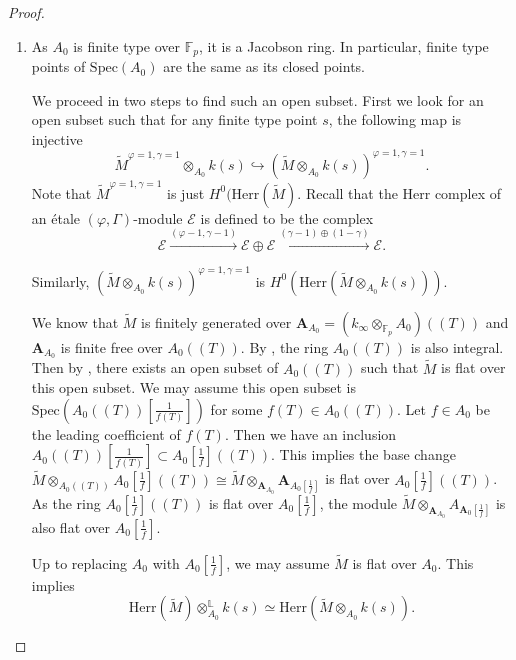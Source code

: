 \documentclass[10pt]{article}
\numberwithin{equation}{section}
\newcommand{\bF}{{\mathbb F}}
\newcommand{\bL}{{\mathbb L}}
\newcommand{\calE}{{\mathcal E}}
\newcommand{\Spec}{{\mathrm{Spec}}}         %
\newcommand{\Herr}{{\mathrm{Herr}}}
\newcommand{\bfA}{{\textbf{A}}}
\begin{document}
\begin{proof}
\begin{enumerate}
        \item As $A_0$ is finite type over $\bF_p$, it is a Jacobson ring. In particular, finite type points of $\Spec(A_0)$ are the same as its closed points.

        We proceed in two steps to find such an open subset. First we look for an open subset such that for any finite type point $s$, the following map is injective
        \[
\tilde M^{\varphi=1,\gamma=1}\otimes_{A_0}k(s)\hookrightarrow (\tilde M\otimes_{A_0}k(s))^{\varphi=1,\gamma=1}.
        \]
        Note that $\tilde M^{\varphi=1,\gamma=1}$ is just $H^0(\Herr(\tilde M)$. Recall that the Herr complex of an \'etale $(\varphi,\Gamma)$-module $\calE$ is defined to be the complex
        \[
        \calE\xrightarrow{(\varphi-1,\gamma-1)} \calE\oplus \calE\xrightarrow{(\gamma-1)\oplus(1-\gamma)}\calE.
        \]
        
        
        Similarly, $(\tilde M\otimes_{A_0}k(s))^{\varphi=1,\gamma=1}$ is $H^0(\Herr(\tilde M\otimes_{A_0}k(s)))$. 
        
        We know that $\tilde M$ is finitely generated over $\bfA_{A_0}=(k_{\infty}\otimes_{\bF_p}A_0)((T))$ and $\bfA_{A_0}$ is finite free over $A_0((T))$. By \cite[Lemma 5.1.5]{EG21}, the ring $A_0((T))$ is also integral. Then by \cite[\href{https://stacks.math.columbia.edu/tag/0529}{Tag 0529}]{stacks-project}, there exists an open subset of $A_0((T))$ such that $\tilde M$ is flat over this open subset. We may assume this open subset is $\Spec(A_0((T))[\frac{1}{f(T)}])$ for some $f(T)\in A_0((T))$. Let $f\in A_0$ be the leading coefficient of $f(T)$. Then we have an inclusion $A_0((T))[\frac{1}{f(T)}]\subset A_0[\frac{1}{f}]((T))$. This implies the base change $\tilde M\otimes_{A_0((T))}A_0[\frac{1}{f}]((T))\cong \tilde M\otimes_{\bfA_{A_0}}\bfA_{A_0[\frac{1}{f}]}$ is flat over $A_0[\frac{1}{f}]((T))$. As the ring $A_0[\frac{1}{f}]((T))$ is flat over $A_0[\frac{1}{f}]$, the module $\tilde M\otimes_{\bfA_{A_0}}A_{\bfA_0[\frac{1}{f}]}$ is also flat over $A_0[\frac{1}{f}]$.

        Up to replacing $A_0$ with $A_0[\frac{1}{f}]$, we may assume $\tilde M$ is flat over $A_0$. This implies  \[
        \Herr(\tilde M)\otimes^{\bL}_{A_0}k(s)\simeq \Herr(\tilde M\otimes_{A_0}k(s)).
        \]


\end{enumerate}
\end{proof}
\end{document}
